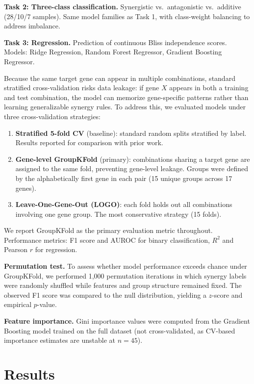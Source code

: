 \documentclass[12pt,a4paper]{article}
\begin{document}
\textbf{Task 2: Three-class classification.} Synergistic vs.\ antagonistic vs.\ additive (28/10/7 samples). Same model families as Task 1, with class-weight balancing to address imbalance.

\textbf{Task 3: Regression.} Prediction of continuous Bliss independence scores. Models: Ridge Regression, Random Forest Regressor, Gradient Boosting Regressor.

Because the same target gene can appear in multiple combinations, standard stratified cross-validation risks data leakage: if gene $X$ appears in both a training and test combination, the model can memorize gene-specific patterns rather than learning generalizable synergy rules. To address this, we evaluated models under three cross-validation strategies:

\begin{enumerate}
    \item \textbf{Stratified 5-fold CV} (baseline): standard random splits stratified by label. Results reported for comparison with prior work.
    \item \textbf{Gene-level GroupKFold} (primary): combinations sharing a target gene are assigned to the same fold, preventing gene-level leakage. Groups were defined by the alphabetically first gene in each pair (15 unique groups across 17 genes).
    \item \textbf{Leave-One-Gene-Out (LOGO)}: each fold holds out all combinations involving one gene group. The most conservative strategy (15 folds).
\end{enumerate}

We report GroupKFold as the primary evaluation metric throughout. Performance metrics: F1 score and AUROC for binary classification, $R^2$ and Pearson $r$ for regression.

\textbf{Permutation test.} To assess whether model performance exceeds chance under GroupKFold, we performed 1,000 permutation iterations in which synergy labels were randomly shuffled while features and group structure remained fixed. The observed F1 score was compared to the null distribution, yielding a $z$-score and empirical $p$-value.

\textbf{Feature importance.} Gini importance values were computed from the Gradient Boosting model trained on the full dataset (not cross-validated, as CV-based importance estimates are unstable at $n = 45$).

\section{Results}
\end{document}

